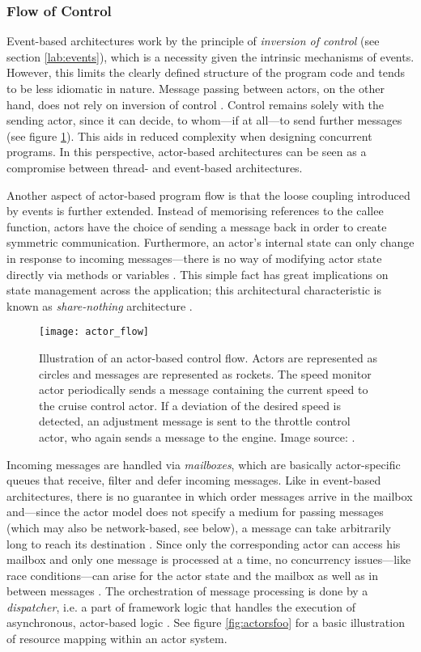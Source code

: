 \subsubsection*{Flow of Control}
Event-based architectures work by the principle of \textit{inversion of control} (see section \ref{lab:events}), which is a necessity given the intrinsic mechanisms of events. However, this limits the clearly defined structure of the program code and tends to be less idiomatic in nature. Message passing between actors, on the other hand, does not rely on inversion of control \cite{Haller2006}. Control remains solely with the sending actor, since it can decide, to whom---if at all---to send further messages (see figure \ref{fig:actor_flow}). This aids in reduced complexity when designing concurrent programs. In this perspective, actor-based architectures can be seen as a compromise between thread- and event-based architectures.

Another aspect of actor-based program flow is that the loose coupling introduced by events is further extended. Instead of memorising references to the callee function, actors have the choice of sending a message back in order to create symmetric communication. Furthermore, an actor's internal state can only change in response to incoming messages---there is no way of modifying actor state directly via methods or variables \cite[p. 38]{Haller2011}. This simple fact has great implications on state management across the application; this architectural characteristic is known as \textit{share-nothing} architecture \cite[p. 3]{Bonetta}.

\begin{figure}
\centering\small
\setlength{\tabcolsep}{0mm}
  \texttt{[image: actor\_flow]}
\caption{
Illustration of an actor-based control flow. Actors are represented as circles and messages are represented as rockets. The speed monitor actor periodically sends a message containing the current speed to the cruise control actor. If a deviation of the desired speed is detected, an adjustment message is sent to the throttle control actor, who again sends a message to the engine. Image source: \cite{Haller2011}.
}
\label{fig:actor_flow}
\end{figure}

Incoming messages are handled via \textit{mailboxes}, which are basically actor-specific queues that receive, filter and defer incoming messages. Like in event-based architectures, there is no guarantee in which order messages arrive in the mailbox and---since the actor model does not specify a medium for passing messages (which may also be network-based, see below), a message can take arbitrarily long to reach its destination \cite[97]{Erb2012}. Since only the corresponding actor can access his mailbox and only one message is processed at a time, no concurrency issues---like race conditions---can arise for the actor state and the mailbox as well as in between messages \cite[p. 12]{Eriksson2013}. The orchestration of message processing is done by a \textit{dispatcher}, i.e. a part of framework logic that handles the execution of asynchronous, actor-based logic \cite[p. 97]{Gupta2012}. See figure \ref{fig:actorsfoo} for a basic illustration of resource mapping within an actor system.

